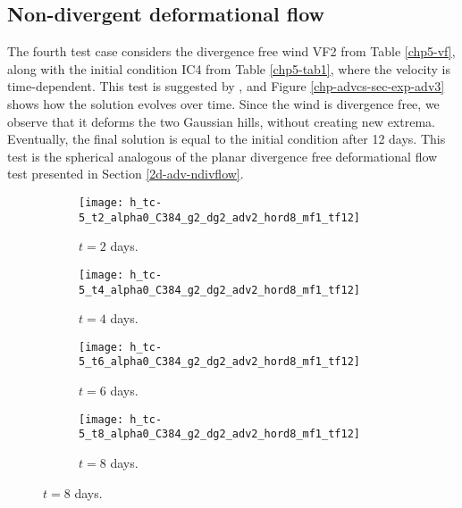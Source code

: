 \newpage
\subsection{Non-divergent deformational flow}
The fourth test case considers the divergence free wind VF2 from Table \ref{chp5-vf}, along with the initial condition IC4 from Table \ref{chp5-tab1}, 
where the velocity is time-dependent.
This test is suggested by \citet{nair:2010}, and Figure \ref{chp-advcs-sec-exp-adv3} shows how the solution evolves over time.
Since the wind is divergence free, we observe that it deforms the two Gaussian hills, without creating new extrema.
Eventually, the final solution is equal to the initial condition after 12 days.
This test is the spherical analogous of the planar divergence free deformational flow test presented in Section \ref{2d-adv-ndivflow}.
\begin{figure}[!htb]
	\centering
	\begin{subfigure}{0.45\textwidth}
		\centering
		\texttt{[image: h\_tc-5\_t2\_alpha0\_C384\_g2\_dg2\_adv2\_hord8\_mf1\_tf12]}
		\caption{$t=2$ days.\label{chp-advcs-sec-exp-adv3-a}}
	\end{subfigure}
	\begin{subfigure}{0.45\textwidth}
		\centering
		\texttt{[image: h\_tc-5\_t4\_alpha0\_C384\_g2\_dg2\_adv2\_hord8\_mf1\_tf12]}
		\caption{$t=4$ days.\label{chp-advcs-sec-exp-adv3-b}}
	\end{subfigure}

	\begin{subfigure}{0.45\textwidth}
		\centering
		\texttt{[image: h\_tc-5\_t6\_alpha0\_C384\_g2\_dg2\_adv2\_hord8\_mf1\_tf12]}
		\caption{$t=6$ days.\label{chp-advcs-sec-exp-adv3-c}}
	\end{subfigure}
	\begin{subfigure}{0.45\textwidth}
		\centering
		\texttt{[image: h\_tc-5\_t8\_alpha0\_C384\_g2\_dg2\_adv2\_hord8\_mf1\_tf12]}
		\caption{$t=8$ days.\label{chp-advcs-sec-exp-adv3-d}}
	\end{subfigure}


\end{figure}
